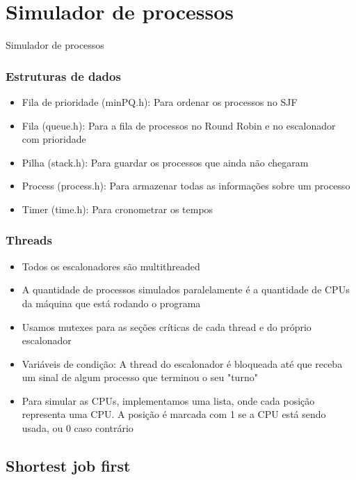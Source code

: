 \documentclass{beamer}
\begin{document}
\section{Simulador de processos}

\begin{frame}
\begin{center}
\huge Simulador de processos
\end{center}
\end{frame}

\begin{frame}
\frametitle{Estruturas de dados}
\begin{itemize}
\item Fila de prioridade (minPQ.h): Para ordenar os processos no SJF
\item Fila (queue.h): Para a fila de processos no Round Robin e no escalonador com prioridade
\item Pilha (stack.h): Para guardar os processos que ainda não chegaram
\item Process (process.h): Para armazenar todas as informações sobre um processo
\item Timer (time.h): Para cronometrar os tempos
\end{itemize}
\end{frame}

\begin{frame}
\frametitle{Threads}
\begin{itemize}
\item Todos os escalonadores são multithreaded
\item A quantidade de processos simulados paralelamente é a quantidade de CPUs da máquina que está rodando o programa
\item Usamos mutexes para as seções críticas de cada thread e do próprio escalonador
\item Variáveis de condição: A thread do escalonador é bloqueada até que receba um sinal de algum processo que terminou o seu "turno"
\item Para simular as CPUs, implementamos uma lista, onde cada posição representa uma CPU. A posição é marcada com 1 se a CPU está sendo usada, ou 0 caso contrário
\end{itemize}
\end{frame}


\subsection{Shortest job first}
\end{document}
